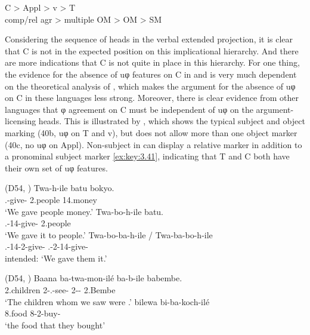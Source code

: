 \documentclass[output=paper]{langsci/langscibook}
\begin{document}
\ea\label{ex:key:3.38}
    \gll    C > Appl > v > T\\
    {comp/rel agr} > {multiple OM} > OM > SM\\
\z

Considering the sequence of heads in the verbal extended projection, it is
clear that C is not in the expected position on this implicational hierarchy.
And there are more indications that C is not quite in place in this hierarchy.
For one thing, the evidence for the absence of uφ features on C in  and
 is very much dependent on the theoretical analysis of ,
which makes the argument for the absence of uφ on C in these languages less
strong. Moreover, there is clear evidence from other  languages that φ
agreement on C must be independent of uφ on the argument-licensing heads. This
is illustrated by , which shows the typical  subject and object
marking (40b, uφ on T and v), but does not allow more than one object marker
(40c, no uφ on Appl). Non-subject  in  can display a
relative marker in addition to a pronominal subject marker \eqref{ex:key:3.41},
indicating that T and C both have their own set of uφ features.

\ea\label{ex:key:3.39}  (D54, \citealt[103]{Iorio2014}) \label{bkm:Ref298742208}
	\ea
	\gll	 Twa-h-ile  batu  bokyo.\\
	    \Fpl.\Sm{}-give-\Pst{}  2.people  14.money\\
	\glt    ‘We gave people money.’
	\ex
	\gll	 Twa-bo-h-ile  batu.\\
	    \Fpl.\Sm{}-14\Om{}{}-give-\Pst{}  2.people\\
	\glt    ‘We gave it to people.’
    \ex
    \gll \llap{*}Twa-bo-ba-h-ile / \llap{*}Twa-ba-bo-h-ile\\
        \Fpl.\Sm{}-14\Om{}-2\Om{}{}-give-\Pst{} {} \Fpl.\Sm{}-2\Om{}-14\Om{}{}-give-\Pst{}\\
    \glt    intended: ‘We gave them it.’
	\z
\z

\ea\label{ex:key:3.40}  (D54, \citealt[152]{Iorio2014}) \label{bkm:Ref347515914}
	\ea
	\gll	 Baana  ba-twa-mon-ilé  ba-b-ile  babembe.\\
	    2.children  2\Rm{}-\Fpl.\Sm{}-see-\Pst{}  2\Sm-\Cop-\Pst{}  2.Bembe\\
	\glt    ‘The children whom we saw were .’
	\ex
	\gll	 bilewa  bi-ba-koch-ilé\\
	    8.food  8\Rm{}-2\Sm{}-buy-\Pst{}\\
	\glt    ‘the food that they bought’
	\z
\z
\end{document}
